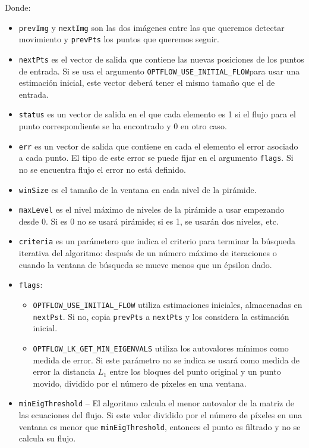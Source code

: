 \documentclass[a4paper,openright, 12pt]{book}
\begin{document}
Donde:
\begin{itemize}
\item \lstinline|prevImg| y \lstinline|nextImg| son las dos imágenes entre las que queremos detectar movimiento y \lstinline|prevPts| los puntos que queremos seguir.
\item \lstinline|nextPts| es el vector de salida que contiene las nuevas posiciones de los puntos de entrada. Si se usa el argumento \lstinline|OPTFLOW_USE_INITIAL_FLOW|para usar una estimación inicial, este vector deberá tener el mismo tamaño que el de entrada.

\item \lstinline|status| es un vector de salida en el que cada elemento es 1 si el flujo para el punto correspondiente se ha encontrado y 0 en otro caso.

\item \lstinline|err| es un vector de salida que contiene en cada el elemento el error asociado a cada punto. El tipo de este error se puede fijar en el argumento \lstinline|flags|.  Si no se encuentra flujo el error no está definido.

\item \lstinline|winSize| es el tamaño de la ventana en cada nivel de la pirámide.


\item \lstinline|maxLevel| es el nivel máximo de niveles  de la pirámide a usar empezando desde 0. Si es 0 no se usará pirámide; si es 1, se usarán dos niveles, etc. 

\item \lstinline|criteria| es un parámetero que indica el criterio para terminar la búsqueda iterativa del algoritmo: después de un número máximo de iteraciones
o cuando la ventana de búsqueda se mueve menos que un épsilon dado.
\item \lstinline|flags|:
	\begin{itemize}
    \item \lstinline|OPTFLOW_USE_INITIAL_FLOW| utiliza estimaciones iniciales, almacenadas en \lstinline|nextPst|. Si no, copia \lstinline|prevPts| a \lstinline|nextPts| y los considera la estimación inicial.
    
    \item \lstinline|OPTFLOW_LK_GET_MIN_EIGENVALS| utiliza los autovalores mínimos como medida de error. Si este parámetro no se indica se usará como medida de error la distancia $L_1$ entre los bloques del punto original y un punto movido, dividido por el número de píxeles en una ventana.
	\end{itemize}
\item \lstinline|minEigThreshold| –  El algoritmo calcula el menor autovalor de la matriz de las ecuaciones del flujo. Si este valor dividido por el número de píxeles en una ventana es menor que \lstinline|minEigThreshold|, entonces el punto es filtrado y no se calcula su flujo.

\end{itemize}
\newpage
\end{document}
